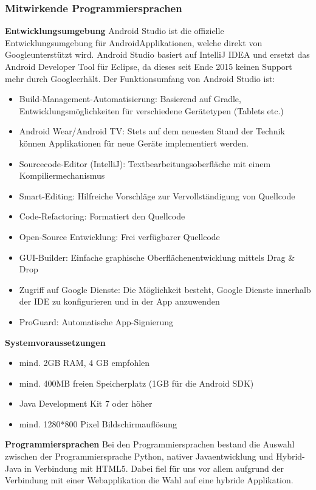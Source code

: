 \subsubsection{Mitwirkende Programmiersprachen}
\label{subsec:androidsprachen}
\textbf{Entwicklungsumgebung\newline}
Android Studio ist die offizielle Entwicklungsumgebung für Android\texttrademark Applikationen, welche direkt von Google\texttrademark unterstützt wird.
Android Studio basiert auf IntelliJ IDEA und ersetzt das Android Developer Tool für Eclipse, da dieses seit Ende 2015 keinen Support mehr durch Google\texttrademark erhält. Der Funktionsumfang von Android Studio ist:
\begin{itemize}
	\item Build-Management-Automatisierung: Basierend auf Gradle, Entwicklungsmöglichkeiten für verschiedene Gerätetypen (Tablets etc.)
	\item Android Wear/Android TV: Stets auf dem neuesten Stand der Technik können Applikationen für neue Geräte implementiert werden.
	\item Sourcecode-Editor (IntelliJ): Textbearbeitungsoberfläche mit einem Kompiliermechanismus
	\item Smart-Editing: Hilfreiche Vorschläge zur Vervollständigung von Quellcode
	\item Code-Refactoring: Formatiert den Quellcode
	\item Open-Source Entwicklung: Frei verfügbarer Quellcode
	\item GUI-Builder: Einfache graphische Oberflächenentwicklung mittels Drag \& Drop
	\item Zugriff auf Google Dienste: Die Möglichkeit besteht, Google Dienste innerhalb der IDE zu konfigurieren und in der App anzuwenden
	\item ProGuard: Automatische App-Signierung
\end{itemize}

\textbf{Systemvoraussetzungen\newline}
\begin{itemize}
	\item mind. 2GB RAM, 4 GB empfohlen
	\item mind. 400MB freien Speicherplatz (1GB für die Android SDK)
	\item Java Development Kit 7 oder höher
	\item mind. 1280*800 Pixel Bildschirmauflösung
\end{itemize}
\textbf{Programmiersprachen\newline}
Bei den Programmiersprachen bestand die Auswahl zwischen der Programmiersprache Python, 
nativer Javaentwicklung und Hybrid-Java in Verbindung mit HTML5.
Dabei fiel für uns vor allem aufgrund der Verbindung mit einer Webapplikation die Wahl auf eine hybride Applikation. 

